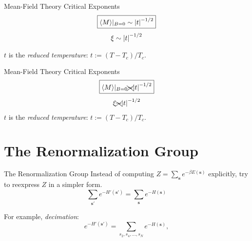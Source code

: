 \documentclass{beamer}
\newcommand{\bolds}[1]{\boldsymbol{#1}}
\newcommand{\expect}[1]{\langle{}{#1}\rangle{}}
\newcommand{\bs}{\bolds{s}}
\renewcommand{\b}{\beta}
\begin{document}
\begin{frame}{Mean-Field Theory Critical Exponents}
  \begin{equation}%
    \boxed{\expect{M}\rvert_{B=0}\sim\abs{t}^{-1/2}}
  \end{equation}%
  \begin{equation}%
    \xi\sim\abs{t}^{-1/2}
\end{equation}%

$t$ is the \textit{reduced temperature}: $t:=(T-T_c)/T_c$.
\end{frame}

\begin{frame}{Mean-Field Theory Critical Exponents}
  \begin{equation}%
    \boxed{\expect{M}\rvert_{B=0}\xcancel{\sim}\abs{t}^{-1/2}}
  \end{equation}%
  \begin{equation}%
    \xi\xcancel{\sim}\abs{t}^{-1/2}
\end{equation}%
$t$ is the \textit{reduced temperature}: $t:=(T-T_c)/T_c$.
\end{frame}

\section{The Renormalization Group}
\begin{frame}{The Renormalization Group}
Instead of computing $Z=\sum_{\bs}e^{-\b E(\bs)}$ explicitly, try to reexpress $Z$ in a simpler form.
\begin{equation}%
\boxed{\sum_{\bs'}e^{-H'(\bs')}=\sum_{\bs}e^{-H(\bs)}}
\end{equation}%

For example, \textit{decimation}:
\begin{equation}%
  e^{-H'(\bs')}=\sum_{s_2,s_4,\ldots,s_N} e^{-H(\bs)},
\end{equation}%
\end{frame}

\end{document}
